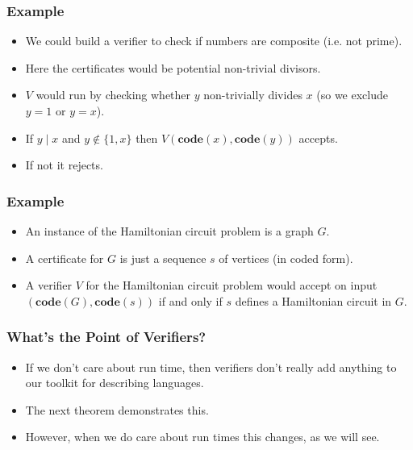 \documentclass[handout]{beamer}
\newcommand{\co}{\mathbf{code}}
\begin{document}
\begin{frame}
\frametitle{Example}
\begin{example}
\begin{itemize}
\item We could build a verifier to check if numbers are composite (i.e. not prime). 
\item Here the certificates would be potential non-trivial divisors. 
\item $V$ would run by checking whether $y$ non-trivially divides $x$ (so we exclude $y=1$ or $y=x$). 
\item If $y\mid x$ and $y\notin\{1,x\}$ then $V(\co(x),\co(y))$ accepts. 
\item If not it rejects.
\end{itemize}
\end{example} 
\end{frame}

\begin{frame}
\frametitle{Example}
\begin{example}
\begin{itemize}
\item An instance of the Hamiltonian circuit problem is a graph $G$. 
\item A certificate for $G$ is just a sequence $s$ of vertices (in coded form). 
\item A verifier $V$ for the Hamiltonian  circuit problem would accept on input $(\co(G),\co(s))$ if and only if $s$ defines a Hamiltonian circuit in $G$.
\end{itemize} 
\end{example}
\end{frame}

\begin{frame}
\frametitle{What's the Point of Verifiers?}
\begin{itemize}
\item If we don't care about run time, then verifiers don't really add anything to our toolkit for describing languages.
\vspace{0.5cm}
\item The next theorem demonstrates this. 
\vspace{0.5cm}
\item However, when we do care about run times this changes, as we will see.
\end{itemize}
\end{frame}
\end{document}
